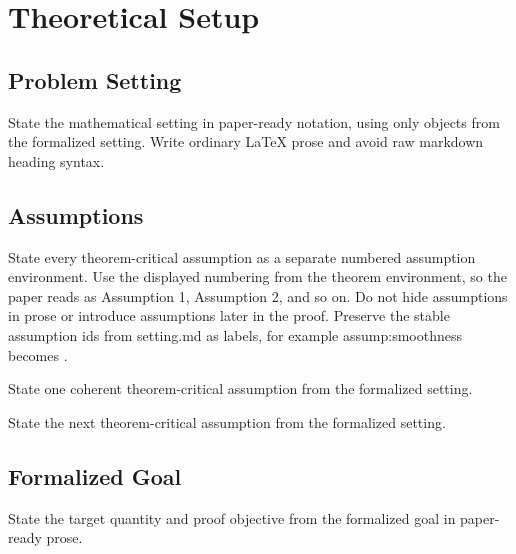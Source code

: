 \section{Theoretical Setup}

\subsection{Problem Setting}

State the mathematical setting in paper-ready notation, using only objects from
the formalized setting. Write ordinary LaTeX prose and avoid raw markdown
heading syntax.

\subsection{Assumptions}

State every theorem-critical assumption as a separate numbered assumption
environment. Use the displayed numbering from the theorem environment, so the
paper reads as Assumption 1, Assumption 2, and so on. Do not hide assumptions
in prose or introduce assumptions later in the proof. Preserve the stable
assumption ids from setting.md as labels, for example assump:smoothness becomes
\label{assump:smoothness}.

\begin{assumption}\label{assump:short-name}
State one coherent theorem-critical assumption from the formalized setting.
\end{assumption}

\begin{assumption}\label{assump:second-name}
State the next theorem-critical assumption from the formalized setting.
\end{assumption}

\subsection{Formalized Goal}

State the target quantity and proof objective from the formalized goal in
paper-ready prose.
